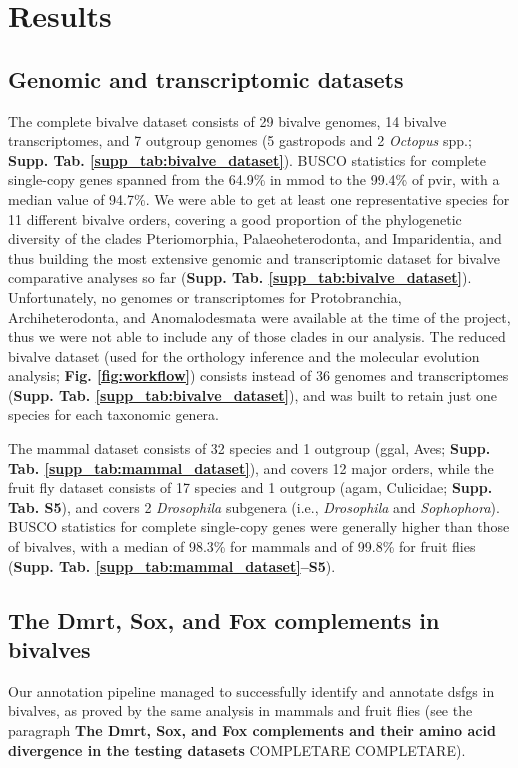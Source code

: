 \documentclass[../main.tex]{subfiles}
\begin{document}
\section{Results} \label{chapter3_results}
\subsection{Genomic and transcriptomic datasets}
The complete bivalve dataset consists of 29 bivalve genomes, 14 bivalve transcriptomes, and 7 outgroup genomes (5 gastropods and 2 \textit{Octopus} spp.; \textbf{Supp. Tab. \ref{supp_tab:bivalve_dataset}}). BUSCO statistics for complete single-copy genes spanned from the 64.9\% in \gls{mmod} to the 99.4\% of \gls{pvir}, with a median value of 94.7\%. We were able to get at least one representative species for 11 different bivalve orders, covering a good proportion of the phylogenetic diversity of the clades Pteriomorphia, Palaeoheterodonta, and Imparidentia, and thus building the most extensive genomic and transcriptomic dataset for bivalve comparative analyses so far (\textbf{Supp. Tab. \ref{supp_tab:bivalve_dataset}}). Unfortunately, no genomes or transcriptomes for Protobranchia, Archiheterodonta, and Anomalodesmata were available at the time of the project, thus we were not able to include any of those clades in our analysis. The reduced bivalve dataset (used for the orthology inference and the molecular evolution analysis; \textbf{Fig. \ref{fig:workflow}}) consists instead of 36 genomes and transcriptomes (\textbf{Supp. Tab. \ref{supp_tab:bivalve_dataset}}), and was built to retain just one species for each taxonomic genera.

The mammal dataset consists of 32 species and 1 outgroup (\gls{ggal}, Aves; \textbf{Supp. Tab. \ref{supp_tab:mammal_dataset}}), and covers 12 major orders, while the fruit fly dataset consists of 17 species and 1 outgroup (\gls{agam}, Culicidae; \textbf{Supp. Tab. S5}), and covers 2 \textit{Drosophila} subgenera (i.e., \textit{Drosophila} and \textit{Sophophora}). BUSCO statistics for complete single-copy genes were generally higher than those of bivalves, with a median of 98.3\% for mammals and of 99.8\% for fruit flies (\textbf{Supp. Tab. \ref{supp_tab:mammal_dataset}--S5}).

\subsection{The Dmrt, Sox, and Fox complements in bivalves}
Our annotation pipeline managed to successfully identify and annotate \glspl{dsfg} in bivalves, as proved by the same analysis in mammals and fruit flies (see the paragraph \textbf{The Dmrt, Sox, and Fox complements and their amino acid divergence in the testing datasets} COMPLETARE COMPLETARE).
\end{document}
